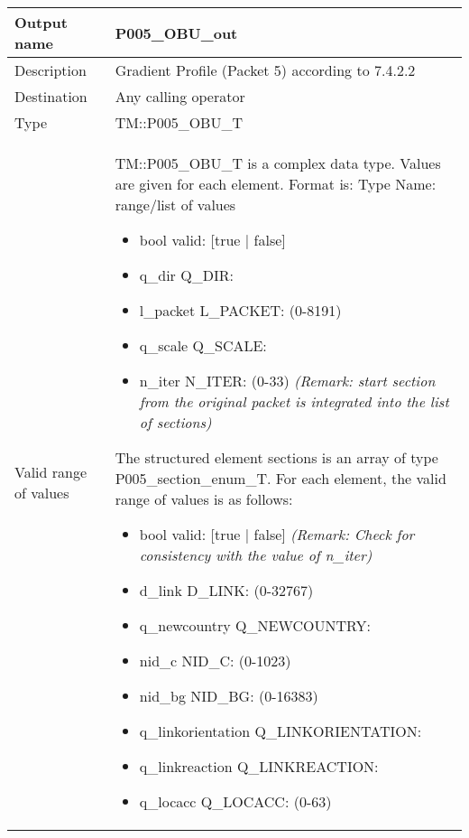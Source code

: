 \begin{longtable}{p{}p{}}
\toprule
Output name				& P005\_OBU\_out \\
\midrule
Description				& Gradient Profile (Packet 5) according to 7.4.2.2 \\
\midrule
Destination				& Any calling operator\\ 
\midrule
Type					& TM::P005\_OBU\_T\\
\midrule
Valid range of values	& TM::P005\_OBU\_T is a complex data type. Values are given for each element. Format is: Type Name: range/list of values
\begin{itemize}
\item bool valid: [true | false]
\item q\_dir Q\_DIR:
\item l\_packet L\_PACKET: (0-8191)
\item q\_scale Q\_SCALE: 
\item n\_iter N\_ITER: (0-33) \emph{(Remark: start section from the original packet is integrated into the list of sections)}
\end{itemize}
The structured element sections is an array of type P005\_section\_enum\_T. For each element, the valid range of values is as follows:
\begin{itemize}
\item bool valid: [true | false] \emph{(Remark: Check for consistency with the value of n\_iter)}
\item d\_link D\_LINK: (0-32767)
\item q\_newcountry Q\_NEWCOUNTRY:
\item nid\_c NID\_C: (0-1023)
\item nid\_bg NID\_BG: (0-16383)
\item q\_linkorientation Q\_LINKORIENTATION:
\item q\_linkreaction Q\_LINKREACTION:
\item q\_locacc Q\_LOCACC: (0-63)
\end{itemize}


\end{longtable}
